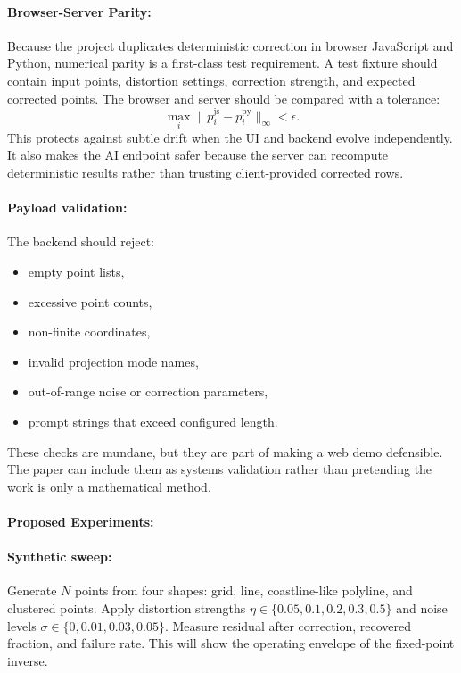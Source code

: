 \documentclass{article}
\begin{document}
\paragraph{Browser-Server Parity:}

Because the project duplicates deterministic correction in browser JavaScript and Python, numerical parity is a first-class test requirement. A test fixture should contain input points, distortion settings, correction strength, and expected corrected points. The browser and server should be compared with a tolerance:
\begin{equation}
  \max_i\|p_i^{\text{js}}-p_i^{\text{py}}\|_\infty < \epsilon.
\end{equation}
This protects against subtle drift when the UI and backend evolve independently. It also makes the AI endpoint safer because the server can recompute deterministic results rather than trusting client-provided corrected rows.

\paragraph{Payload validation:}

The backend should reject:
\begin{itemize}
  \item empty point lists,
  \item excessive point counts,
  \item non-finite coordinates,
  \item invalid projection mode names,
  \item out-of-range noise or correction parameters,
  \item prompt strings that exceed configured length.
\end{itemize}
These checks are mundane, but they are part of making a web demo defensible. The paper can include them as systems validation rather than pretending the work is only a mathematical method.

\paragraph{Proposed Experiments:}

\paragraph{Synthetic sweep:}

Generate $N$ points from four shapes: grid, line, coastline-like polyline, and clustered points. Apply distortion strengths $\eta\in\{0.05,0.1,0.2,0.3,0.5\}$ and noise levels $\sigma\in\{0,0.01,0.03,0.05\}$. Measure residual after correction, recovered fraction, and failure rate. This will show the operating envelope of the fixed-point inverse.
\end{document}

